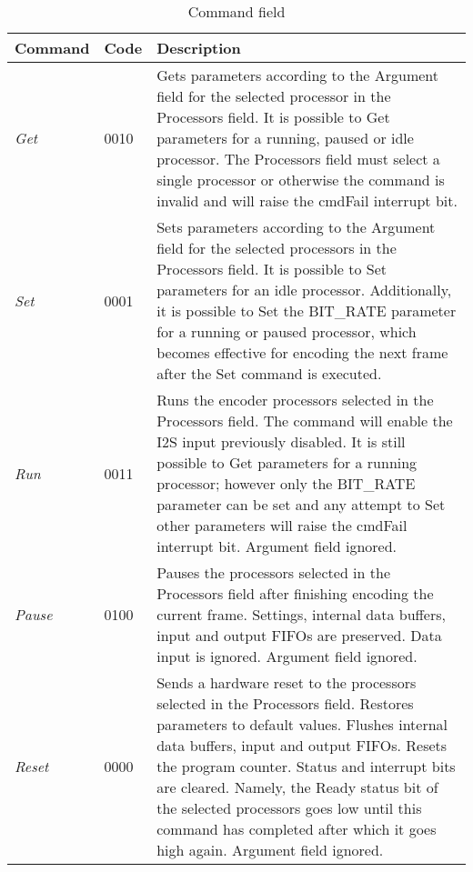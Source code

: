\documentclass{ug}
\theoremstyle{plain}
\begin{document}
\begin{table}[H]
  \begin{center}
    \begin{tabular}{|l|l|p{12cm}|}
      \hline
      \rowcolor{iob-green}
      \textbf{Command} & \textbf{Code} & \textbf{Description} \\
      \hline
      \hline

      \textit{Get} & 0010 & Gets parameters according to the Argument field for
      the selected processor in the Processors field. It is possible to Get
      parameters for a running, paused or idle processor. The Processors field
      must select a single processor or otherwise the command is invalid and
      will raise the cmdFail interrupt bit.\\ \hline
      \rowcolor{iob-blue} \textit{Set} & 0001 & Sets parameters according to the
      Argument field for the selected processors in the Processors field. It is
      possible to Set parameters for an idle processor. Additionally, it is
      possible to Set the BIT\_RATE parameter for a running or paused processor,
      which becomes effective for encoding the next frame after the Set command
      is executed.\\ \hline

      \textit{Run} & 0011 & Runs the encoder processors selected in the
      Processors field. The command will enable the I2S input previously
      disabled. It is still possible to Get parameters for a running processor;
      however only the BIT\_RATE parameter can be set and any attempt to Set
      other parameters will raise the cmdFail interrupt bit. Argument
      field ignored.\\ \hline

      \rowcolor{iob-blue} \textit{Pause} & 0100 & Pauses the processors selected
      in the Processors field after finishing encoding the current
      frame. Settings, internal data buffers, input and output FIFOs are
      preserved. Data input is ignored. Argument field ignored.\\ \hline

      \textit{Reset} & 0000 & Sends a hardware reset to the processors selected
      in the Processors field. Restores parameters to default values. Flushes
      internal data buffers, input and output FIFOs. Resets the program
      counter. Status and interrupt bits are cleared. Namely, the Ready status
      bit of the selected processors goes low until this command has completed
      after which it goes high again. Argument field ignored.\\ \hline

    \end{tabular}
    \caption{Command field}
    \label{tab:spi-cmd}
  \end{center}
\end{table}
\end{document}
